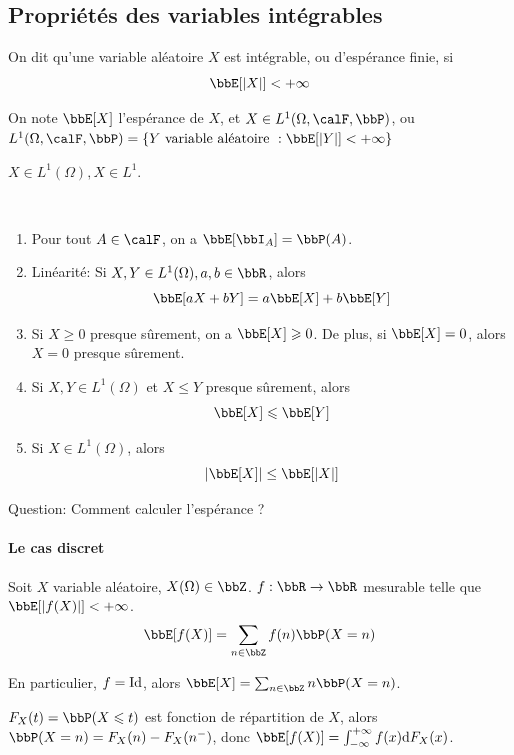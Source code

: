 \subsection{Propriétés des variables intégrables}

\begin{deff}
    On dit qu'une variable aléatoire $X$ est intégrable, ou d'espérance finie, si
    \[ \bbE[\lrvert{X}] < +\infty \]

    On note $\bbE[X]$ l'espérance de $X$, et $X \in L^1(\Omega, \calF, \bbP)$,
    ou $L^1(\Omega, \calF, \bbP) = \{ Y \text{ variable aléatoire }: \bbE[\lrvert{Y}] < +\infty \}$
\end{deff}

\begin{rqq}
    $X \in L^1(\Omega), X \in L^1$.
\end{rqq}

\begin{prop}
    $\ $
    \begin{enumerate}
        \item Pour tout $A \in \calF$, on a $\bbE[\bbI_A] = \bbP(A)$.
        \item Linéarité: Si $X, Y \in L^1(\Omega), a, b \in \bbR$, alors
              \[ \bbE[aX + bY] = a \bbE[X] + b \bbE[Y] \]
        \item Si $X \geqslant 0$ presque sûrement, on a $\bbE[X] \geqslant 0$.
              De plus, si $\bbE[X] = 0$, alors $X = 0$ presque sûrement.
        \item Si $X, Y \in L^1(\Omega)$ et $X \leqslant Y$ presque sûrement, alors
              \[ \bbE[X] \leqslant \bbE[Y] \]
        \item Si $X \in L^1(\Omega)$, alors
              \[ \lrvert{\bbE[X]} \leq \bbE[\lrvert{X}] \]
    \end{enumerate}
\end{prop}

Question: Comment calculer l'espérance ?

\paragraph{Le cas discret} Soit $X$ variable aléatoire, $X(\Omega) \in \bbZ$.
$f: \bbR \to \bbR$ mesurable telle que $\bbE[\lrvert{f(X)}] < +\infty$.
\[ \bbE[f(X)] = \sum_{n \in \bbZ} f(n) \bbP(X = n) \]

En particulier, $f = \operatorname{Id}$, alors $\bbE[X] = \sum_{n \in \bbZ} n \bbP(X = n)$.

$F_X(t) = \bbP(X \leqslant t)$ est fonction de répartition de $X$,
alors $\bbP(X = n) = F_X(n) - F_X(n^-)$,
donc $\bbE[f(X)] = \int_{-\infty}^{+\infty} f(x) \dif F_X(x)$.

